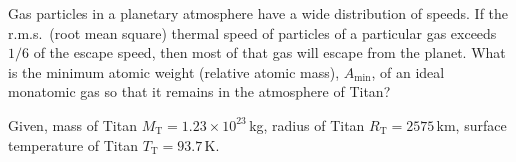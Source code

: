 Gas particles in a planetary atmosphere have a wide distribution of speeds. If
the r.m.s.\ (root mean square) thermal speed of particles of a particular gas
exceeds $1/6$ of the escape speed, then most of that gas will escape from the
planet. What is the minimum atomic weight (relative atomic mass),
$A_{\min}$, of an ideal monatomic gas so that it remains in the atmosphere of
Titan?

Given, mass of Titan $M_{\mathrm{T}} = 1.23 \times 10^{23}$\,kg, radius of
Titan $R_{\mathrm{T}} = 2575$\,km, surface temperature of Titan
$T_{\mathrm{T}} = 93.7$\,K.
